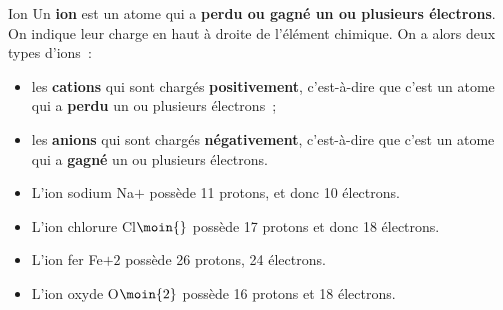 \documentclass[../main/main.tex]{subfiles}
\begin{document}
\begin{tcbraster}[raster columns=2, raster equal height=rows]
    \begin{defi}[label=def:ion]{Ion}
        Un \textbf{ion} est un atome qui a \textbf{perdu ou gagné un ou plusieurs
        électrons}. On indique leur charge en haut à droite de l'élément chimique.
        On a alors deux types d'ions~:
        \begin{itemize}
            \item les \textbf{cations} qui sont chargés \textbf{positivement},
                c'est-à-dire que c'est un atome qui a \textbf{perdu} un ou plusieurs
                électrons~;
            \item les \textbf{anions} qui sont chargés \textbf{négativement},
                c'est-à-dire que c'est un atome qui a \textbf{gagné} un ou plusieurs
                électrons.
        \end{itemize}
    \end{defi}
    \begin{exem}[label=exem:ion]{}
        \begin{itemize}
            \item L'ion sodium Na$\plus{}$ possède 11 protons, et donc 10 électrons.  
            \item L'ion chlorure Cl$\moin{}$ possède 17 protons et donc 18
                électrons. 
        \end{itemize}
        \begin{itemize}
            \item L'ion fer Fe$\plus{2}$ possède 26 protons, 24 électrons. 
            \item L'ion oxyde O$\moin{2}$ possède 16 protons et 18 électrons.
        \end{itemize}
    \end{exem}
\end{tcbraster}
\end{document}

